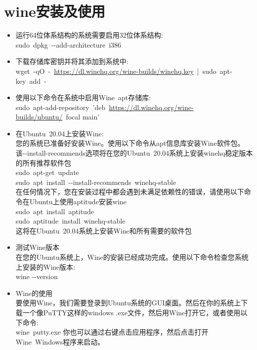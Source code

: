 \documentclass[10pt,a4paper]{article}
\begin{document}
\section{\rm{wine}安装及使用}
\begin{itemize}
	\item 运行64位体系结构的系统需要启用32位体系结构:\\
		\textrm{sudo~dpkg~-\/-add-architecture~i386}
	\item 下载存储库密钥并将其添加到系统中:\\
		\textrm{wget~-qO~-~\url{https://dl.winehq.org/wine-builds/winehq.key}~|~sudo~apt-key~add~-~}
	\item 使用以下命令在系统中启用\textrm{Wine~apt}存储库:\\
		\textrm{sudo~apt-add-repository~'deb~\url{https://dl.winehq.org/wine-builds/ubuntu/}~focal main'}
	\item 在\textrm{Ubuntu~20.04}上安装\textrm{Wine}:\\
		您的系统已准备好安装\textrm{Wine}。使用以下命令从\textrm{apt}信息库安装\textrm{Wine}软件包。该\textrm{-\/-install-recommends}选项将在您的\textrm{Ubuntu~20.04}系统上安装\textrm{winehq}稳定版本的所有推荐软件包\\
		\textrm{sudo~apt-get~update}\\
		\textrm{sudo~apt~install~-\/-install-recommends~winehq-stable}\\
		在任何情况下，您在安装过程中都会遇到未满足依赖性的错误，请使用以下命令在\textrm{Ubuntu}上使用\textrm{aptitude}安装\textrm{wine}\\
		\textrm{sudo~apt~install~aptitude}\\
		\textrm{sudo~aptitude~install~winehq-stable}\\
		这将在\textrm{Ubuntu~20.04}系统上安装Wine和所有需要的软件包\\
	\item 测试\textrm{Wine}版本\\
		在您的\textrm{Ubuntu}系统上，\textrm{Wine}的安装已经成功完成。使用以下命令检查您系统上安装的\textrm{Wine}版本:\\
		\textrm{wine -\/-version}
	\item \textrm{Wine}的使用\\
		要使用\textrm{Wine}，我们需要登录到\textrm{Ubuntu}系统的\textrm{GUI}桌面。然后在你的系统上下载一个像\textrm{PuTTY}这样的\textrm{windows .exe}文件，然后用\textrm{Wine}打开它，或者使用以下命令:\\
		\textrm{wine~putty.exe}
		你也可以通过右键点击应用程序，然后点击打开\textrm{Wine~Windows}程序来启动。
\end{itemize}
\end{document}
